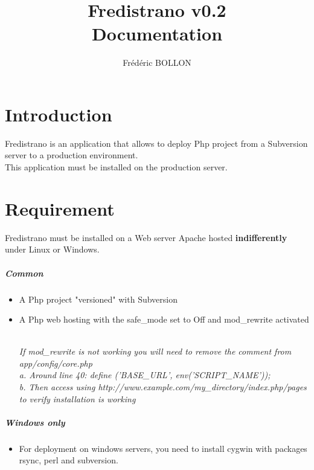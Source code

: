 \documentclass[12pt,a4paper]{report}
\author{Frédéric BOLLON}
\title{Fredistrano v0.2\\Documentation\\}
\begin{document}
\maketitle
\tableofcontents

\chapter{Introduction}
Fredistrano is an application that allows to deploy Php project from a Subversion server to a production environment.\\
This application must be installed on the production server.

\chapter{Requirement}
Fredistrano must be installed on a Web server Apache hosted \textbf{indifferently} under Linux or Windows.
\paragraph*{Common}
\begin{itemize}
\item 
A Php project "versioned" with Subversion
\item 
A Php web hosting with the safe\_mode set to Off and mod\_rewrite activated\\\\
\begin{small}\textit{If mod\_rewrite is not working you will need to remove the comment from app/config/core.php\\
      a. Around line 40: define ('BASE\_URL', env('SCRIPT\_NAME'));\\
      b. Then access using http://www.example.com/my\_directory/index.php/pages to verify installation is working}\end{small}
\end{itemize}

\paragraph*{Windows only}
\begin{itemize}
\item
For deployment on windows servers, you need to install cygwin with packages rsync, perl and subversion.

\end{itemize}
\end{document}
